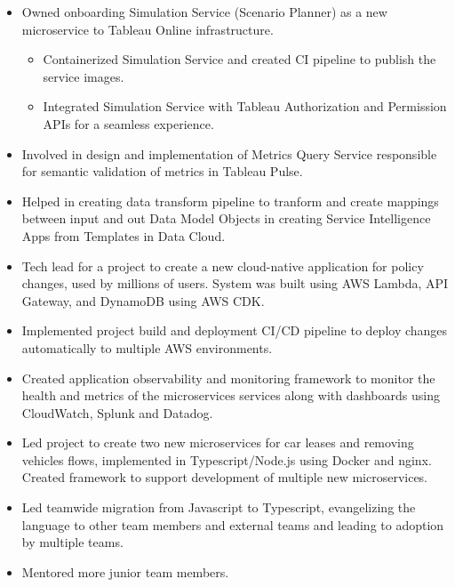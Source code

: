 \documentclass[11pt,a4paper,sans]{moderncv}
\begin{document}
{ \begin{itemize} \itemsep 2pt
  \item Owned onboarding Simulation Service (Scenario Planner) as a new microservice to Tableau Online infrastructure. 
  { \begin{itemize} \itemsep 2pt
        \item Containerized Simulation Service and created CI pipeline to publish the service images.
        \item Integrated Simulation Service with Tableau Authorization and Permission APIs for a seamless experience.
    \end{itemize}}
  \item Involved in design and implementation of Metrics Query Service responsible for semantic validation of metrics in Tableau Pulse.
  \item Helped in creating data transform pipeline to tranform and create mappings between input and out Data Model Objects in creating Service Intelligence Apps from Templates in Data Cloud.
 \end{itemize} }

{ \begin{itemize} \itemsep -1pt
  \item Tech lead for a project to create a new cloud-native application for policy changes, used by millions of users. System was built using AWS Lambda, API Gateway, and DynamoDB using AWS CDK.
  \item Implemented project build and deployment CI/CD pipeline to deploy changes automatically to multiple AWS environments.
  \item Created application observability and monitoring framework to monitor the health and metrics of the microservices services along with dashboards using CloudWatch, Splunk and Datadog.
  \item Led project to create two new microservices for car leases and removing vehicles flows, implemented in Typescript/Node.js using Docker and nginx. Created framework to support development of multiple new microservices.
  \item Led teamwide migration from Javascript to Typescript, evangelizing the language to other team members and external teams and leading to adoption by multiple teams.
  \item Mentored more junior team members.
 \end{itemize} }
\end{document}
